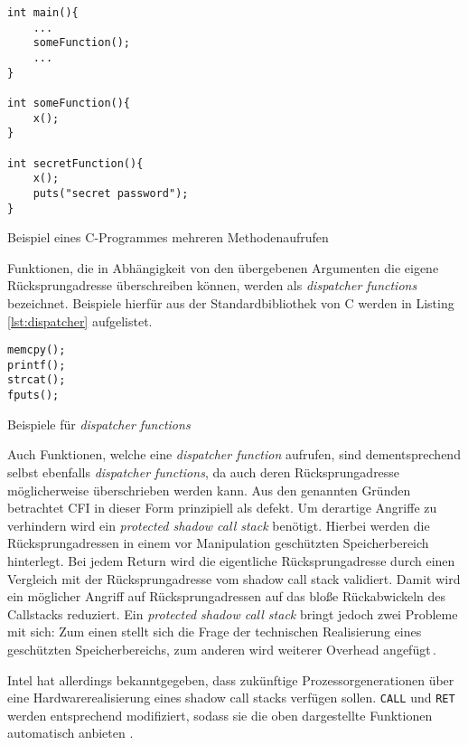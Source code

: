 \begin{listing}
\begin{verbatim}
int main(){
	...
	someFunction();
	...
}

int someFunction(){
	x();
}

int secretFunction(){
	x();
	puts("secret password");
}
\end{verbatim}
\caption{Beispiel eines C-Programmes mehreren Methodenaufrufen}
\label{lst:c_many_printf}
\end{listing}

Funktionen, die in Abhängigkeit von den übergebenen Argumenten die eigene Rücksprungadresse überschreiben können, werden als \emph{dispatcher functions} bezeichnet. Beispiele hierfür aus der Standardbibliothek von C werden in Listing \ref{lst:dispatcher} aufgelistet.
\begin{listing}
\begin{verbatim}
memcpy();
printf();
strcat();
fputs();
\end{verbatim}
\caption{Beispiele für \emph{dispatcher functions}}
\label{lst:dispatcher}
\end{listing}
Auch Funktionen, welche eine \emph{dispatcher function} aufrufen, sind dementsprechend selbst ebenfalls \emph{dispatcher functions}, da auch deren Rücksprungadresse möglicherweise überschrieben werden kann. Aus den genannten Gründen betrachtet \cite[S. 167]{Carlini.2015} CFI in dieser Form prinzipiell als defekt. Um derartige Angriffe zu verhindern wird ein \emph{protected shadow call stack} benötigt. Hierbei werden die Rücksprungadressen in einem vor Manipulation geschützten Speicherbereich hinterlegt. Bei jedem Return wird die eigentliche Rücksprungadresse durch einen Vergleich mit der Rücksprungadresse vom shadow call stack validiert. Damit wird ein möglicher Angriff auf Rücksprungadressen auf das bloße Rückabwickeln des Callstacks reduziert. Ein \emph{protected shadow call stack} bringt jedoch zwei Probleme mit sich: Zum einen stellt sich die Frage der technischen Realisierung eines geschützten Speicherbereichs, zum anderen wird weiterer Overhead angefügt\,\cite[S.164]{Carlini.2015}.

Intel hat allerdings bekanntgegeben, dass zukünftige Prozessorgenerationen über eine Hardwarerealisierung eines shadow call stacks verfügen sollen. \texttt{CALL} und \texttt{RET} werden entsprechend modifiziert, sodass sie die oben dargestellte Funktionen automatisch anbieten \cite{Intel.2016}.


